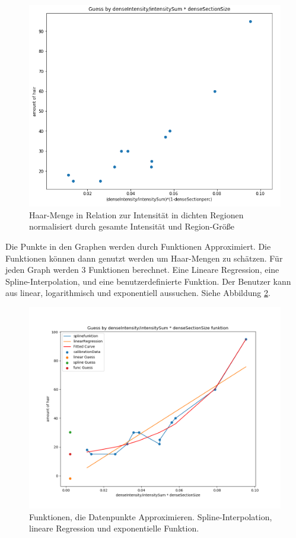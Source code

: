 \documentclass[german,a4paper,12pt]{llncs}
\begin{document}
\begin{figure}
	\centering
	\includegraphics[width=1.2\textwidth]{fig64/gh4.PNG}
	\caption[]{Haar-Menge in Relation zur Intensität in dichten Regionen normalisiert durch gesamte Intensität und Region-Größe}
	\label{fig:mapping}
\end{figure}

Die Punkte in den Graphen werden durch Funktionen Approximiert. Die Funktionen können dann genutzt werden um Haar-Mengen zu schätzen.
Für jeden Graph werden 3 Funktionen berechnet. Eine Lineare Regression, eine Spline-Interpolation, und eine benutzerdefinierte Funktion.
Der Benutzer kann aus linear, logarithmisch und exponentiell aussuchen.
Siehe Abbildung \ref{fig:func}.

\begin{figure}
	\centering
	\includegraphics[width=1.2\textwidth]{fig64/g11_denseIntensitynorm.png}
	\caption[]{Funktionen, die Datenpunkte Approximieren. Spline-Interpolation, lineare Regression und exponentielle Funktion.}
	\label{fig:func}
\end{figure} 
\end{document}
